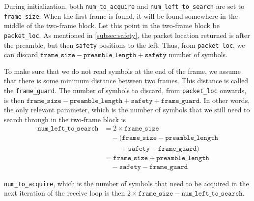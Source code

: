 During initialization, both \verb+num_to_acquire+ and \verb+num_left_to_search+
are set to \verb+frame_size+. When the first frame is found, it will be found
somewhere in the middle of the two-frame block. Let this point in the two-frame
block be \verb+packet_loc+. As mentioned in \ref{subsec:safety}, the packet
location returned is after the preamble, but then \verb+safety+ positions to
the left. Thus, from \verb+packet_loc+, we can discard $\texttt{frame\_size}
- \texttt{preamble\_length} + \texttt{safety}$ number of symbols.

To make sure that we do not read symbols at the end of the frame, we assume
that there is some minimum distance between two frames. This distance is called
the \verb+frame_guard+. The number of symbols to discard, from
\verb+packet_loc+ onwards, is then $\texttt{frame\_size}
- \texttt{preamble\_length} + \texttt{safety} + \texttt{frame\_guard}$. In
other words, the only relevant parameter, which is the number of symbols that
we still need to search through in the two-frame block is
\begin{equation}
	\begin{split}
		\texttt{num\_left\_to\_search} &= 2 \times \texttt{frame\_size} \\
		                               & \quad - (\texttt{frame\_size} - \texttt{preamble\_length} \\
		                               & \quad \quad \; + \texttt{safety} + \texttt{frame\_guard}) \\
		                               &= \texttt{frame\_size} + \texttt{preamble\_length} \\
		                               & \quad - \texttt{safety} - \texttt{frame\_guard}
	\end{split}
\end{equation}

\verb+num_to_acquire+, which is the number of symbols that need to be acquired
in the next iteration of the receive loop is then
$2 \times \texttt{frame\_size} - \texttt{num\_left\_to\_search}$.

